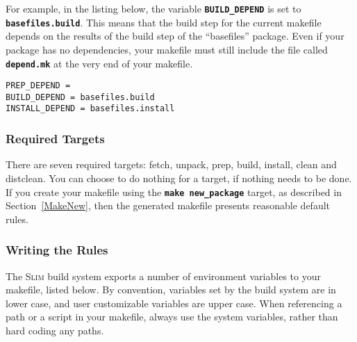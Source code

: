 \documentclass[a4paper,10pt]{article}
\newcommand{\slim}{\textsc{Slim}\xspace}
\newcommand{\fw}{\tt\bf}
\begin{document}
    For example, in the listing below, the variable {\fw BUILD\_DEPEND}
    is set to {\fw basefiles.build}. This means that the build step
    for the current makefile depends on the results of the build step
    of the ``basefiles'' package. Even if your package has no
    dependencies, your makefile must still include the file called
    {\fw depend.mk} at the very end of your makefile.

\begin{lstlisting}
PREP_DEPEND =
BUILD_DEPEND = basefiles.build
INSTALL_DEPEND = basefiles.install
\end{lstlisting}

\subsubsection{Required Targets}

    There are seven required targets: fetch, unpack, prep, build,
    install, clean and distclean. You can choose to do nothing for a
    target, if nothing needs to be done. If you create your makefile
    using the {\fw make new\_package} target, as described in
    Section~\ref{MakeNew}, then the generated makefile presents
    reasonable default rules.

\subsubsection{Writing the Rules}

    The \slim build system exports a number of environment variables
    to your makefile, listed below. By convention, variables set by
    the build system are in lower case, and user customizable
    variables are upper case. When referencing a path or a script in
    your makefile, always use the system variables, rather than hard
    coding any paths.
\end{document}

